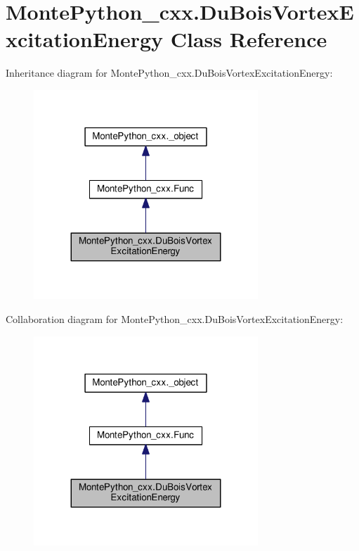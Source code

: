 \hypertarget{classMontePython__cxx_1_1DuBoisVortexExcitationEnergy}{}\section{Monte\+Python\+\_\+cxx.\+Du\+Bois\+Vortex\+Excitation\+Energy Class Reference}
\label{classMontePython__cxx_1_1DuBoisVortexExcitationEnergy}


Inheritance diagram for Monte\+Python\+\_\+cxx.\+Du\+Bois\+Vortex\+Excitation\+Energy\+:
\nopagebreak
\begin{figure}[H]
\begin{center}
\leavevmode
\includegraphics[width=239pt]{classMontePython__cxx_1_1DuBoisVortexExcitationEnergy__inherit__graph}
\end{center}
\end{figure}


Collaboration diagram for Monte\+Python\+\_\+cxx.\+Du\+Bois\+Vortex\+Excitation\+Energy\+:
\nopagebreak
\begin{figure}[H]
\begin{center}
\leavevmode
\includegraphics[width=239pt]{classMontePython__cxx_1_1DuBoisVortexExcitationEnergy__coll__graph}
\end{center}
\end{figure}
